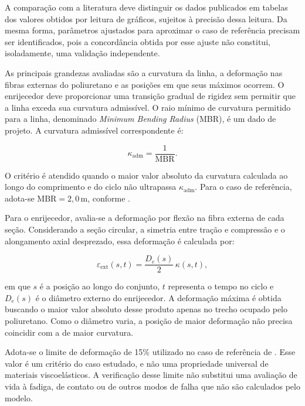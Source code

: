 \documentclass[arial,centeredequations,english,brazilian,oneside,section=TITLE]{ifes8}
\begin{document}
A comparação com a literatura deve distinguir os dados publicados em tabelas dos valores
obtidos por leitura de gráficos, sujeitos à precisão dessa leitura. Da mesma forma, parâmetros
ajustados para aproximar o caso de referência precisam ser identificados, pois a concordância
obtida por esse ajuste não constitui, isoladamente, uma validação independente.

As principais grandezas avaliadas são a curvatura da linha, a deformação nas fibras externas
do poliuretano e as posições em que seus máximos ocorrem. O enrijecedor deve proporcionar
uma transição gradual de rigidez sem permitir que a linha exceda sua curvatura admissível.
O raio mínimo de curvatura permitido para a linha, denominado \emph{Minimum Bending Radius}
(MBR), é um dado de projeto. A curvatura admissível correspondente é:

\begin{equation}
\label{eq:mbr}
\kappa_\text{adm} = \frac{1}{\text{MBR}}.
\end{equation}

O critério é atendido quando o maior valor absoluto da curvatura calculada ao longo do
comprimento e do ciclo não ultrapassa $\kappa_\text{adm}$. Para o caso de referência,
adota-se $\text{MBR}=2{,}0\,\mathrm{m}$, conforme .

Para o enrijecedor, avalia-se a deformação por flexão na fibra externa de cada seção.
Considerando a seção circular, a simetria entre tração e compressão e o alongamento axial
desprezado, essa deformação é calculada por:

\begin{equation}
\label{eq:deformacao-maxima}
\varepsilon_\text{ext}(s,t) = \frac{D_e(s)}{2}\,\kappa(s,t),
\end{equation}

em que $s$ é a posição ao longo do conjunto, $t$ representa o tempo no ciclo e $D_e(s)$
é o diâmetro externo do enrijecedor. A deformação máxima é obtida buscando o maior valor
absoluto desse produto apenas no trecho ocupado pelo poliuretano. Como o diâmetro varia,
a posição de maior deformação não precisa coincidir com a de maior curvatura.

Adota-se o limite de deformação de 15\% utilizado no caso de referência de
. Esse valor é um critério do caso estudado, e não
uma propriedade universal de materiais viscoelásticos. A verificação desse limite não
substitui uma avaliação de vida à fadiga, de contato ou de outros modos de falha que não
são calculados pelo modelo.
\end{document}
